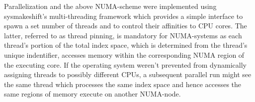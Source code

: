     Parallelization and the above NUMA-scheme were implemented using sysmakeshift's \cite{sysmakeshift:github}
    multi-threading framework which provides a simple interface to spawn a set number of threads and to control their
    affinities to CPU cores. The latter, referred to as thread pinning, is mandatory for NUMA-systems as each thread's
    portion of the total index space, which is determined from the thread's unique indentifier, accesses memory within
    the corresponding NUMA region of the executing core. If the operating system weren't prevented from dynamically
    assigning threads to possibly different CPUs, a subsequent parallel run might see the same thread which processes
    the same index space and hence accesses the same regions of memory execute on another NUMA-node.

